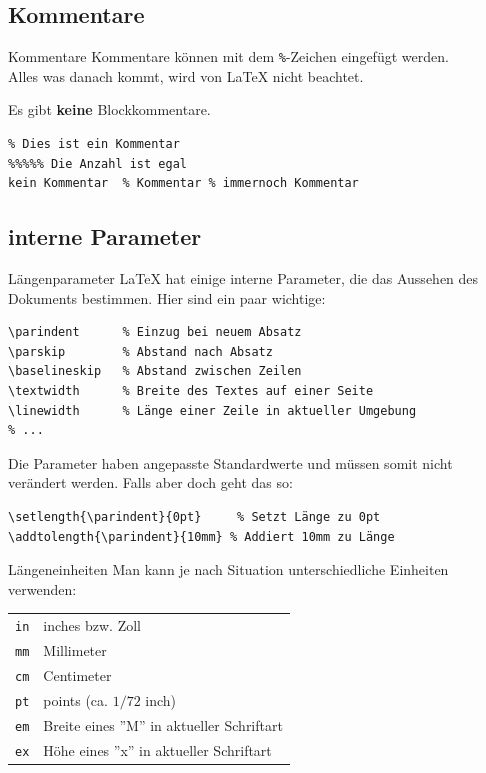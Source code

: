 \documentclass[xcolor=dvipsnames]{beamer}
\begin{document}
\subsection{Kommentare}
\begin{frame}[fragile]{Kommentare}
Kommentare können mit dem \texttt{\%}-Zeichen eingefügt werden. \\
Alles was danach kommt, wird von \LaTeX{} nicht beachtet. \par\medskip
Es gibt \textbf{keine} Blockkommentare. \par\medskip
\begin{lstlisting}
% Dies ist ein Kommentar
%%%%% Die Anzahl ist egal
kein Kommentar	% Kommentar % immernoch Kommentar
\end{lstlisting}
\end{frame}


\subsection{interne Parameter}
\begin{frame}[fragile]{Längenparameter}
\LaTeX{} hat einige interne Parameter, die das Aussehen des Dokuments bestimmen. Hier sind ein paar wichtige: \par\medskip
\begin{lstlisting}
\parindent 		% Einzug bei neuem Absatz
\parskip 		% Abstand nach Absatz
\baselineskip 	% Abstand zwischen Zeilen
\textwidth 		% Breite des Textes auf einer Seite
\linewidth 		% Länge einer Zeile in aktueller Umgebung
% ...
\end{lstlisting}
Die Parameter haben angepasste Standardwerte und müssen somit nicht verändert werden. Falls aber doch geht das so: \par\medskip
\begin{lstlisting}
\setlength{\parindent}{0pt} 	% Setzt Länge zu 0pt
\addtolength{\parindent}{10mm} % Addiert 10mm zu Länge
\end{lstlisting}
\end{frame}


\begin{frame}[fragile]{Längeneinheiten}
Man kann je nach Situation unterschiedliche Einheiten verwenden: \par\medskip
\begin{tabular}{ll}
\texttt{in} & inches bzw. Zoll \\
\texttt{mm} & Millimeter \\
\texttt{cm} & Centimeter \\
\texttt{pt} & points (ca. $1/72$ inch) \\
\texttt{em} & Breite eines ''M'' in aktueller Schriftart \\
\texttt{ex} & Höhe eines ''x'' in aktueller Schriftart
\end{tabular}
\end{frame}
\end{document}
